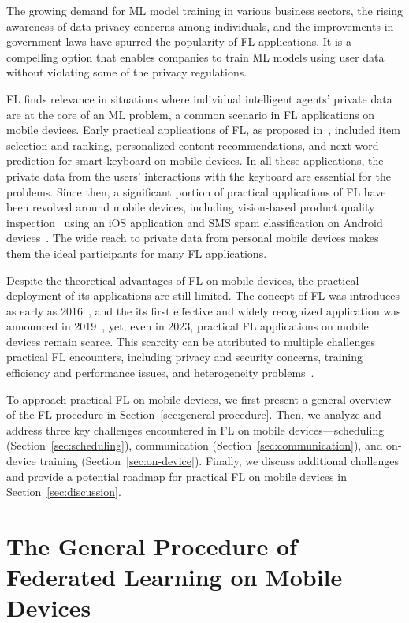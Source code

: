 \documentclass[conference]{IEEEtran}
\begin{document}
The growing demand for ML model training in various business sectors,
the rising awareness of data privacy concerns among individuals,
and the improvements in government laws have spurred
the popularity of FL applications.
It is a compelling option that enables companies to train ML models using
user data without violating some of the privacy regulations.

FL finds relevance in situations where
individual intelligent agents' private data are at the core of an ML problem,
a common scenario in FL applications on mobile devices.
Early practical applications of FL,
as proposed in~\cite{bonawitz2019towards},
included item selection and ranking,
personalized content recommendations,
and next-word prediction for smart keyboard on mobile devices.
In all these applications,
the private data from the users' interactions with
the keyboard are essential for the problems.
Since then, a significant portion of practical applications of FL have been
revolved around mobile devices,
including vision-based product quality inspection~\cite{bharti2022edge} using
an iOS application and
SMS spam classification on Android devices~\cite{sriraman2022device}.
The wide reach to private data from personal mobile devices makes
them the ideal participants for many FL applications.

Despite the theoretical advantages of FL on mobile devices,
the practical deployment of its applications are still limited.
The concept of FL was introduces as early as 2016~\cite{mcmahan2017communication},
and the its first effective and widely recognized application
was announced in 2019~\cite{bonawitz2019towards},
yet, even in 2023, practical FL applications on mobile devices remain scarce.
This scarcity can be attributed to multiple challenges practical FL encounters,
including privacy and security concerns,
training efficiency and performance issues,
and heterogeneity problems~\cite{wen2023survey}.

To approach practical FL on mobile devices,
we first present a general overview of the FL procedure in
Section~\ref{sec:general-procedure}.
Then, we analyze and address three key challenges encountered in
FL on mobile devices—scheduling (Section~\ref{sec:scheduling}),
communication (Section~\ref{sec:communication}), and
on-device training (Section~\ref{sec:on-device}).
Finally, we discuss additional challenges and
provide a potential roadmap for practical FL on mobile devices in
Section~\ref{sec:discussion}.

\section{The General Procedure of Federated Learning on Mobile Devices}
\end{document}
